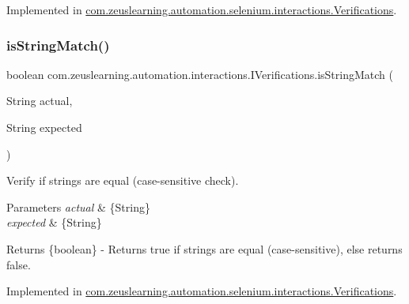 Implemented in \hyperlink{classcom_1_1zeuslearning_1_1automation_1_1selenium_1_1interactions_1_1Verifications_a1b059d92d48f2d58bafddcef7deb3a54}{com.\+zeuslearning.\+automation.\+selenium.\+interactions.\+Verifications}.

\hypertarget{interfacecom_1_1zeuslearning_1_1automation_1_1interactions_1_1IVerifications_a0851452498cc023e1c68afdd95b23912}{}\label{interfacecom_1_1zeuslearning_1_1automation_1_1interactions_1_1IVerifications_a0851452498cc023e1c68afdd95b23912} 
\subsubsection{\texorpdfstring{is\+String\+Match()}{isStringMatch()}}
{\footnotesize\ttfamily boolean com.\+zeuslearning.\+automation.\+interactions.\+I\+Verifications.\+is\+String\+Match (\begin{DoxyParamCaption}\item[{String}]{actual,  }\item[{String}]{expected }\end{DoxyParamCaption})}

Verify if strings are equal (case-\/sensitive check).


\begin{DoxyParams}{Parameters}
{\em actual} & \{String\} \\
\hline
{\em expected} & \{String\} \\
\hline
\end{DoxyParams}
\begin{DoxyReturn}{Returns}
\{boolean\} -\/ Returns {\ttfamily true} if strings are equal (case-\/sensitive), else returns {\ttfamily false}. 
\end{DoxyReturn}


Implemented in \hyperlink{classcom_1_1zeuslearning_1_1automation_1_1selenium_1_1interactions_1_1Verifications_aebf1b991764984120a1f05adb69fdc4d}{com.\+zeuslearning.\+automation.\+selenium.\+interactions.\+Verifications}.

\hypertarget{interfacecom_1_1zeuslearning_1_1automation_1_1interactions_1_1IVerifications_a9ff9d7c332e151b80a80396d264d1cd5}{}\label{interfacecom_1_1zeuslearning_1_1automation_1_1interactions_1_1IVerifications_a9ff9d7c332e151b80a80396d264d1cd5} 
